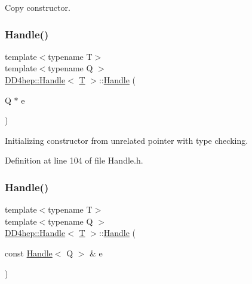 Copy constructor. 

\hypertarget{class_d_d4hep_1_1_handle_afc97f7c5cabc4750eb8c060080c3e433}{}\label{class_d_d4hep_1_1_handle_afc97f7c5cabc4750eb8c060080c3e433} 
\subsubsection{\texorpdfstring{Handle()}{Handle()}\hspace{0.1cm}{\footnotesize\ttfamily [4/5]}}
{\footnotesize\ttfamily template$<$typename T$>$ \\
template$<$typename Q $>$ \\
\hyperlink{class_d_d4hep_1_1_handle}{D\+D4hep\+::\+Handle}$<$ \hyperlink{class_t}{T} $>$\+::\hyperlink{class_d_d4hep_1_1_handle}{Handle} (\begin{DoxyParamCaption}\item[{Q $\ast$}]{e }\end{DoxyParamCaption})\hspace{0.3cm}{\ttfamily [inline]}}



Initializing constructor from unrelated pointer with type checking. 



Definition at line 104 of file Handle.\+h.

\hypertarget{class_d_d4hep_1_1_handle_a792c02f1acfc5a4356c8d390b00e3c68}{}\label{class_d_d4hep_1_1_handle_a792c02f1acfc5a4356c8d390b00e3c68} 
\subsubsection{\texorpdfstring{Handle()}{Handle()}\hspace{0.1cm}{\footnotesize\ttfamily [5/5]}}
{\footnotesize\ttfamily template$<$typename T$>$ \\
template$<$typename Q $>$ \\
\hyperlink{class_d_d4hep_1_1_handle}{D\+D4hep\+::\+Handle}$<$ \hyperlink{class_t}{T} $>$\+::\hyperlink{class_d_d4hep_1_1_handle}{Handle} (\begin{DoxyParamCaption}\item[{const \hyperlink{class_d_d4hep_1_1_handle}{Handle}$<$ Q $>$ \&}]{e }\end{DoxyParamCaption})\hspace{0.3cm}{\ttfamily [inline]}}



